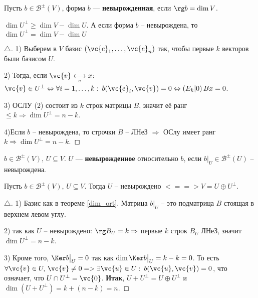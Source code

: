 \begin{to_def} 
	Пусть  $b \in \mathcal{B}^\pm (V)$, форма $b$ --- \textbf{невырожденная},
	 если $\rg b = \dim V$.
\end{to_def}

\begin{to_thr} 
	$\dim U^\bot \geq \dim V - \dim U$. А если форма $b$ -- невырождена, то $\dim U^\bot = \dim V - \dim U$
	\label{dim_ort}
\end{to_thr}

\begin{proof}[$\triangle$]
	1) Выберем в $V$ базис $(\vc{e}_1,\ldots,\vc{e}_n)$ так, чтобы первые $k$ векторов были базисом $U$.

	2) Тогда, если $\vc{v} \underset{e}{\longleftrightarrow} x$: $\vc{v} \in U^\bot \Leftrightarrow \forall i = 1,\ldots,k: \: b(\vc{e}_i, \vc{v}) = 0 \Leftrightarrow \left(E_k | 0\right) B x = 0$.

	3) ОСЛУ (2) состоит из $k$ строк матрицы $B$, значит её ранг $\leq k \Longrightarrow \dim U^\bot = n -k$.

	4)Если $b$ -- невырождена, то строчки $B$ -- ЛНеЗ $\Longrightarrow$ ОСлу имеет ранг $k \Longrightarrow \dim U^\bot = n -k$.
\end{proof}

\begin{to_def} 
	$b \in \mathcal{B}^\pm (V), \, U \subseteq V$. $U$ --- \textbf{невырожденное} относительно $b$, если $b \big|_U \in \mathcal{B}^\pm (U)$ -- невырождена. 
\end{to_def}

\begin{to_thr} 
	 Пусть $b \in \mathcal{B}^\pm (V), \, U \subseteq V$. Тогда $U$ -- невырождено $<==> V = U \oplus U^\bot$.
\end{to_thr}

\begin{proof}[$\triangle$]
	1) Базис как в теореме \eqref{dim_ort}. Матрица $b \big|_U$ -- это подматрица $B$ стоящая в верхнем левом углу.

	2) так как $U$ -- невырождено: $\rg B_U = k \Rightarrow$ первые $k$ строк $B_U$ ЛНеЗ, значит $\dim U^\bot = n -k$.

	3) Кроме того, $\Ker b \big|_U = 0$ так как $\dim \Ker b \big|_U = k - k = 0$. То есть $\forall \vc{v} \in U, \, \vc{v} \neq 0 => \exists \vc{u} \in U: \: b(\vc{u},\vc{v}) = 0$, что означает, что $U \cap U^\bot = \vc{0}$. \textbf{Итак}, $U + U^\bot = U \oplus U^\bot$ и $\dim(U + U^\bot) = k + (n-k) = n$.
\end{proof}

